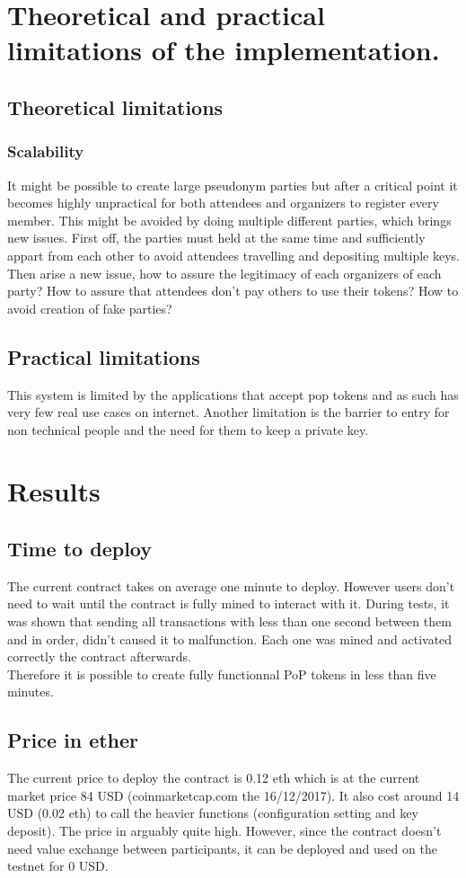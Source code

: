 \documentclass[11pt, a4paper, twoside, openright]{book} %
\begin{document}
\section{Theoretical and practical limitations of the implementation.}
\subsection{Theoretical limitations}
\subsubsection*{Scalability}
It might be possible to create large pseudonym parties but after a critical point it becomes highly unpractical for both attendees and organizers to register every member. This might be avoided by doing multiple different parties, which brings new issues. First off, the parties must held at the same time and sufficiently appart from each other to avoid attendees travelling and depositing multiple keys. Then arise a new issue, how to assure the legitimacy of each organizers of each party? How to assure that attendees don't pay others to use their tokens? How to avoid creation of fake parties?


\subsection{Practical limitations}
This system is limited by the applications that accept pop tokens and as such has very few real use cases on internet.
Another limitation is the barrier to entry for non technical people and the need for them to keep a private key.
\section{Results}
\subsection{Time to deploy}
The current contract takes on average one minute to deploy. However users don't need to wait until the contract is fully mined to interact with it. During tests, it was shown that sending all transactions with less than one second between them and in order, didn't caused it to malfunction. Each one was mined and activated correctly the contract afterwards. \\
Therefore it is possible to create fully functionnal PoP tokens in less than five minutes.
\subsection{Price in ether}
The current price to deploy the contract is 0.12 eth which is at the current market price 84 USD (coinmarketcap.com the 16/12/2017). It also cost around 14 USD (0.02 eth) to call the heavier functions (configuration setting and key deposit). The price in arguably quite high. However, since the contract doesn't need value exchange between participants, it can be deployed and used on the testnet for 0 USD.
\end{document}
